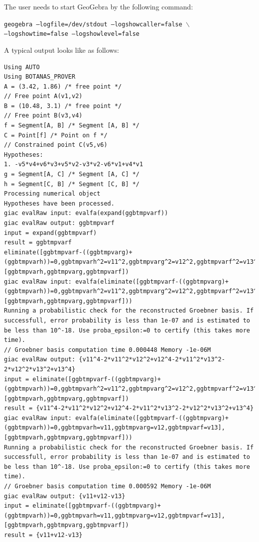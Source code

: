 \documentclass{article}
\begin{document}
The user needs to start GeoGebra by the following command:
{
    \begin{center}
        \texttt{geogebra --logfile=/dev/stdout --logshowcaller=false $\backslash$\\ --logshowtime=false --logshowlevel=false} 
    \end{center}
} %
A typical output looks like as follows:
{
\scriptsize
\begin{lstlisting}[language=mylog]
Using AUTO
Using BOTANAS_PROVER
A = (3.42, 1.86) /* free point */
// Free point A(v1,v2)
B = (10.48, 3.1) /* free point */
// Free point B(v3,v4)
f = Segment[A, B] /* Segment [A, B] */
C = Point[f] /* Point on f */
// Constrained point C(v5,v6)
Hypotheses:
1. -v5*v4+v6*v3+v5*v2-v3*v2-v6*v1+v4*v1
g = Segment[A, C] /* Segment [A, C] */
h = Segment[C, B] /* Segment [C, B] */
Processing numerical object
Hypotheses have been processed.
giac evalRaw input: evalfa(expand(ggbtmpvarf))
giac evalRaw output: ggbtmpvarf
input = expand(ggbtmpvarf)
result = ggbtmpvarf
eliminate([ggbtmpvarf-((ggbtmpvarg)+(ggbtmpvarh))=0,ggbtmpvarh^2=v11^2,ggbtmpvarg^2=v12^2,ggbtmpvarf^2=v13^2],[ggbtmpvarh,ggbtmpvarg,ggbtmpvarf])
giac evalRaw input: evalfa(eliminate([ggbtmpvarf-((ggbtmpvarg)+(ggbtmpvarh))=0,ggbtmpvarh^2=v11^2,ggbtmpvarg^2=v12^2,ggbtmpvarf^2=v13^2],[ggbtmpvarh,ggbtmpvarg,ggbtmpvarf]))
Running a probabilistic check for the reconstructed Groebner basis. If successfull, error probability is less than 1e-07 and is estimated to be less than 10^-18. Use proba_epsilon:=0 to certify (this takes more time).
// Groebner basis computation time 0.000448 Memory -1e-06M
giac evalRaw output: {v11^4-2*v11^2*v12^2+v12^4-2*v11^2*v13^2-2*v12^2*v13^2+v13^4}
input = eliminate([ggbtmpvarf-((ggbtmpvarg)+(ggbtmpvarh))=0,ggbtmpvarh^2=v11^2,ggbtmpvarg^2=v12^2,ggbtmpvarf^2=v13^2],[ggbtmpvarh,ggbtmpvarg,ggbtmpvarf])
result = {v11^4-2*v11^2*v12^2+v12^4-2*v11^2*v13^2-2*v12^2*v13^2+v13^4}
giac evalRaw input: evalfa(eliminate([ggbtmpvarf-((ggbtmpvarg)+(ggbtmpvarh))=0,ggbtmpvarh=v11,ggbtmpvarg=v12,ggbtmpvarf=v13],[ggbtmpvarh,ggbtmpvarg,ggbtmpvarf]))
Running a probabilistic check for the reconstructed Groebner basis. If successfull, error probability is less than 1e-07 and is estimated to be less than 10^-18. Use proba_epsilon:=0 to certify (this takes more time).
// Groebner basis computation time 0.000592 Memory -1e-06M
giac evalRaw output: {v11+v12-v13}
input = eliminate([ggbtmpvarf-((ggbtmpvarg)+(ggbtmpvarh))=0,ggbtmpvarh=v11,ggbtmpvarg=v12,ggbtmpvarf=v13],[ggbtmpvarh,ggbtmpvarg,ggbtmpvarf])
result = {v11+v12-v13}

\end{lstlisting}}
\end{document}
